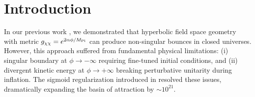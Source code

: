 \documentclass[11pt,a4paper]{article}
\begin{document}
\begin{abstract}
singularity. This hierarchy is set by the initial field value $\phi_{\rm bounce} \approx 10\,M_{\rm Pl}$---a choice of initial conditions, not a universal prediction of the model. Predictions---$n_s \approx \nsAnalytical$, $r \approx \rAnalytical$, $f_{\rm NL}^{\rm local} \approx \fNLCMBdeltaN$, independent of the regularization parameter $\alpha$---are consistent with Planck 2018 and testable by next-generation CMB experiments.
\end{abstract}

\section{Introduction}
\label{sec:intro}

In our previous work \cite{Kravchenko2025v1}, we demonstrated that hyperbolic field space geometry with metric $g_{\chi\chi} = e^{2\alpha\phi/M_{\rm Pl}}$ can produce non-singular bounces in closed universes. However, this approach suffered from fundamental physical limitations: (i) singular boundary at $\phi \to -\infty$ requiring fine-tuned initial conditions, and (ii) divergent kinetic energy at $\phi \to +\infty$ breaking perturbative unitarity during inflation. The sigmoid regularization introduced in \cite{Kravchenko2025v3} resolved these issues, dramatically expanding the basin of attraction by $\sim 10^{21}$.
\end{document}
